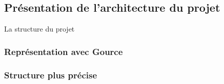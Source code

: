 \subsection{Présentation de l'architecture du projet}
La structure du projet

\subsubsection{Représentation avec Gource}

\subsubsection{Structure plus précise}


